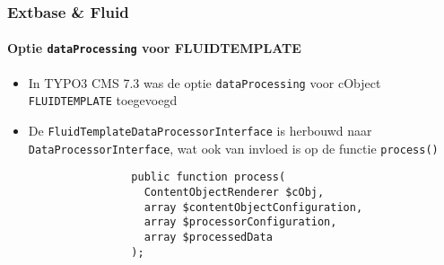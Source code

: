 \begin{frame}[fragile]
	\frametitle{Extbase \& Fluid}
	\framesubtitle{Optie \texttt{dataProcessing} voor FLUIDTEMPLATE}

	\lstset{basicstyle=\tiny\ttfamily}

	\begin{itemize}

		\item In TYPO3 CMS 7.3 was de optie \texttt{dataProcessing} voor cObject \texttt{FLUIDTEMPLATE}  toegevoegd

		\item De \texttt{FluidTemplateDataProcessorInterface} is herbouwd naar \texttt{DataProcessorInterface},
			wat ook van invloed is op de functie \texttt{process()}

			\begin{lstlisting}
				public function process(
				  ContentObjectRenderer $cObj,
				  array $contentObjectConfiguration,
				  array $processorConfiguration,
				  array $processedData
				);
			\end{lstlisting}

	\end{itemize}

	\breakingchange

\end{frame}

